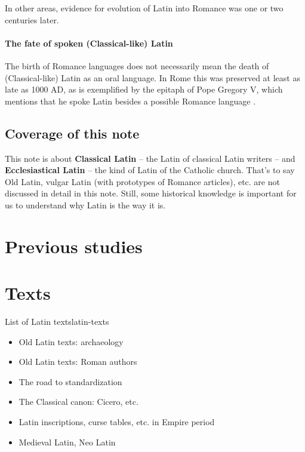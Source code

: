 \documentclass[a4paper, oneside, 12pt]{report}
\newcommand*{\citepage}[1]{p.~{#1}}
\newcommand*{\concept}[1]{\textbf{#1}}
\begin{document}
In other areas, evidence for evolution of Latin into Romance was one or two centuries later.

\paragraph*{The fate of spoken (Classical-like) Latin}
The birth of Romance languages does not necessarily mean 
the death of (Classical-like) Latin as an oral language.
In Rome this was preserved at least as late as 1000 AD,
as is exemplified by the epitaph of Pope Gregory V,
which mentions that he spoke Latin besides a possible Romance language 
\citep[\citepage{268}]{clackson2011blackwell}.

\subsection{Coverage of this note}

This note is about \concept{Classical Latin} -- the Latin of classical Latin writers -- 
and \concept{Ecclesiastical Latin} -- the kind of Latin of the Catholic church.
That's to say Old Latin, vulgar Latin (with prototypes of Romance articles), etc.
are not discussed in detail in this note.
Still, some historical knowledge is important for us to understand 
why Latin is the way it is. 


\section{Previous studies}


\section{Texts}

\begin{todobox}{List of Latin texts}{latin-texts}
 \begin{itemize}
    \item Old Latin texts: archaeology
    \item Old Latin texts: Roman authors
    \item The road to standardization
    \item The Classical canon: Cicero, etc.
    \item Latin inscriptions, curse tables, etc. in Empire period
    \item Medieval Latin, Neo Latin
\end{itemize}
   
\end{todobox}
\end{document}
